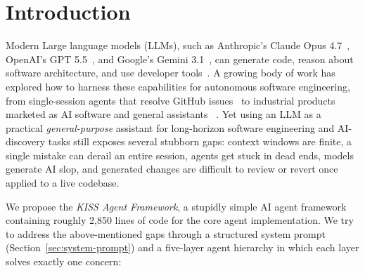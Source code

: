 \documentclass{article}
\begin{document}
\begin{abstract}
We deliberately prioritize output quality over speed: giving a frontier model adequate time to validate its own output (running linters, type checkers, and tests) reduces the low-quality code common in faster but less thorough agents.  The entire system was built using itself in 4 months, providing a continuous stress test in which any bug was patched as it appeared.  On Terminal~Bench~2.0, KISS Sorcar achieves a 62.2\% overall pass rate with Claude Opus~4.6, compared with Claude~Code (58\%) and Cursor Composer~2 (61.7\%), without any benchmark-specific tuning of prompts or models.
\end{abstract}

\section{Introduction}
\label{sec:intro}

Modern Large language models (LLMs), such as Anthropic's Claude Opus 4.7~\citep{anthropic2026opus47}, OpenAI's GPT 5.5~\citep{openai2026gpt55}, and Google's Gemini 3.1~\citep{google2026gemini31}, can generate code, reason about software architecture, and use developer tools~\citep{chen2021evaluating,roziere2023code}.  A growing body of work has explored how to harness these capabilities for autonomous software engineering, from single-session agents that resolve GitHub issues~\citep{yang2024sweagent,wang2024openhands} to industrial products marketed as AI software and general assistants ~\citep{copilot2021,cursor2024,devin2024,claudecode2025,codex2025,openclaw2025}.  Yet using an LLM as a practical \emph{general-purpose} assistant for long-horizon software engineering and AI-discovery tasks still exposes several stubborn gaps: context windows are finite, a single mistake can derail an entire session, agents get stuck in dead ends, models generate AI slop, and generated changes are difficult to review or revert once applied to a live codebase.

We propose the \emph{KISS Agent Framework}, a stupidly simple AI agent framework containing roughly 2,850 lines of code for the core agent implementation.  We try to address the above-mentioned gaps through a structured system prompt (Section~\ref{sec:system-prompt}) and a five-layer agent hierarchy in which each layer solves exactly one concern:
\end{document}
